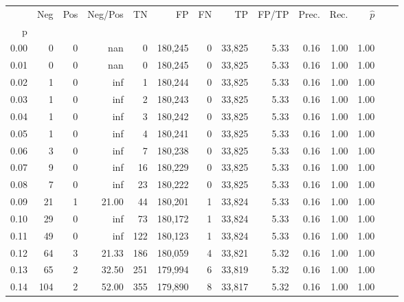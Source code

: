 \begin{tabular}{rrrrrrrrrrrrrr}
\toprule
{} &    Neg &    Pos & Neg/Pos &       TN &       FP &      FN &      TP & FP/TP & Prec. &  Rec. & $\hat{p}$ \\
p    &        &        &         &          &          &         &         &       &       &       &           \\
\midrule
0.00 &      0 &      0 &     nan &        0 &  180,245 &       0 &  33,825 &  5.33 &  0.16 &  1.00 &      1.00 \\
0.01 &      0 &      0 &     nan &        0 &  180,245 &       0 &  33,825 &  5.33 &  0.16 &  1.00 &      1.00 \\
0.02 &      1 &      0 &     inf &        1 &  180,244 &       0 &  33,825 &  5.33 &  0.16 &  1.00 &      1.00 \\
0.03 &      1 &      0 &     inf &        2 &  180,243 &       0 &  33,825 &  5.33 &  0.16 &  1.00 &      1.00 \\
0.04 &      1 &      0 &     inf &        3 &  180,242 &       0 &  33,825 &  5.33 &  0.16 &  1.00 &      1.00 \\
0.05 &      1 &      0 &     inf &        4 &  180,241 &       0 &  33,825 &  5.33 &  0.16 &  1.00 &      1.00 \\
0.06 &      3 &      0 &     inf &        7 &  180,238 &       0 &  33,825 &  5.33 &  0.16 &  1.00 &      1.00 \\
0.07 &      9 &      0 &     inf &       16 &  180,229 &       0 &  33,825 &  5.33 &  0.16 &  1.00 &      1.00 \\
0.08 &      7 &      0 &     inf &       23 &  180,222 &       0 &  33,825 &  5.33 &  0.16 &  1.00 &      1.00 \\
0.09 &     21 &      1 &   21.00 &       44 &  180,201 &       1 &  33,824 &  5.33 &  0.16 &  1.00 &      1.00 \\
0.10 &     29 &      0 &     inf &       73 &  180,172 &       1 &  33,824 &  5.33 &  0.16 &  1.00 &      1.00 \\
0.11 &     49 &      0 &     inf &      122 &  180,123 &       1 &  33,824 &  5.33 &  0.16 &  1.00 &      1.00 \\
0.12 &     64 &      3 &   21.33 &      186 &  180,059 &       4 &  33,821 &  5.32 &  0.16 &  1.00 &      1.00 \\
0.13 &     65 &      2 &   32.50 &      251 &  179,994 &       6 &  33,819 &  5.32 &  0.16 &  1.00 &      1.00 \\
0.14 &    104 &      2 &   52.00 &      355 &  179,890 &       8 &  33,817 &  5.32 &  0.16 &  1.00 &      1.00 \\

\end{tabular}
